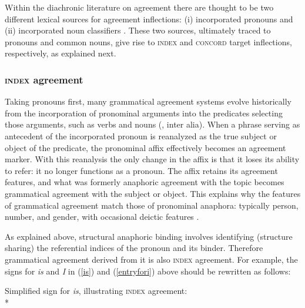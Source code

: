 \documentclass[output=paper,biblatex,babelshorthands,newtxmath,draftmode,colorlinks,citecolor=brown]{langscibook}
\begin{document}
Within the diachronic literature on agreement there are thought to be two different lexical sources
for agreement inflections: (i) incorporated pronouns and (ii) incorporated noun classifiers
\citep{greenberg:1978}.
These two sources, ultimately traced to pronouns and common nouns, give rise to \textsc{index} and
\textsc{concord} target inflections, respectively, as explained next.


\subsubsection{\textsc{index} agreement}

\largerpage
Taking pronouns first, many grammatical agreement systems evolve historically from the incorporation
of pronominal arguments into the predicates selecting those arguments, such as verbs and nouns
(\citealt{bopp:1842,givon:1976,wald:1979}, inter alia).  When a phrase serving as antecedent of the
incorporated pronoun is reanalyzed as the true subject or object of the predicate, the pronominal
affix effectively becomes an agreement marker.  With this reanalysis the only change in the affix is
that it loses its ability to refer: it no longer functions as a pronoun.  The affix retains its
agreement features, and what was formerly anaphoric agreement with the topic becomes grammatical
agreement with the subject or object.  This explains why the features of grammatical agreement match
those of pronominal anaphora: typically person, number, and gender, with occasional deictic features
\citep[752]{bresnan+mchombo:1987}.

As explained above, structural anaphoric binding involves identifying (structure sharing) the
referential indices of the pronoun and its binder.  Therefore grammatical agreement derived from it
is also \textsc{index} agreement.  For example, the signs for  \textit{is} and
\textit{I} in (\ref{is}) and (\ref{entryfori}) above should be rewritten as follows:

\begin{exe} 

\ex\label{is2}\label{le-is}
	Simplified sign for \textit{is}, illustrating \textsc{index} agreement:\\*
\end{exe}
\end{document}
